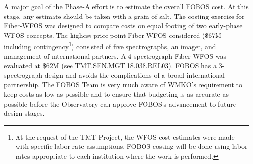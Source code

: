 
A major goal of the Phase-A effort is to estimate the overall FOBOS cost. At this stage, any estimate should be taken
with a grain of salt. The costing exercise for Fiber-WFOS was designed to compare costs on equal footing of two
early-phase WFOS concepts. The highest price-point Fiber-WFOS considered (\$67M including contingency\footnote{At the
request of the TMT Project, the WFOS cost estimates were made with specific labor-rate assumptions. FOBOS costing will
be done using labor rates appropriate to each institution where the work is performed.}) consisted of five
spectrographs, an imager, and management of international partners. A 4-spectrograph Fiber-WFOS was evaluated at \$62M
(see TMT.SEN.MGT.18.038.REL03).  FOBOS has a 3-spectrograph design and avoids the complications of a broad
international partnership.  The FOBOS Team is very much aware of WMKO's requirement to keep costs as low as possible
and to ensure that budgeting is as accurate as possible before the Observatory can approve FOBOS's advancement to
future design stages.





